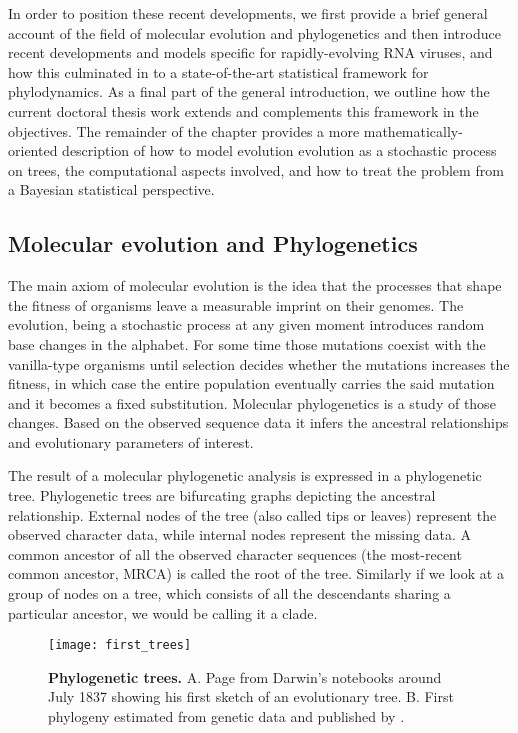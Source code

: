 In order to position these recent developments, we first provide a brief general account of the field of molecular evolution and phylogenetics and then introduce recent developments and models specific for rapidly-evolving RNA viruses, and how this culminated in to a state-of-the-art statistical framework for phylodynamics. As a final part of the general introduction, we outline how the current doctoral thesis work extends and complements this framework in the objectives.
The remainder of the chapter provides a more mathematically-oriented description of how to model evolution evolution as a stochastic process on trees, the computational aspects involved, and how to treat the problem from a Bayesian statistical perspective.

\subsection{Molecular evolution and Phylogenetics\label{sub:molevol}}

The main axiom of molecular evolution is the idea that the processes that shape the fitness of organisms leave a measurable imprint on their genomes.
The evolution, being a stochastic process at any given moment introduces random base changes in the alphabet.
For some time those mutations coexist with the vanilla-type organisms until selection decides whether the mutations increases the fitness, in which case the entire population eventually carries the said mutation and it becomes a fixed substitution.  
Molecular phylogenetics is a study of those changes.
Based on the observed sequence data it infers the ancestral relationships and evolutionary parameters of interest.

The result of a molecular phylogenetic analysis is expressed in a phylogenetic tree. 
Phylogenetic trees are bifurcating graphs depicting the ancestral relationship.
External nodes of the tree (also called tips or leaves) represent the observed character data, while internal nodes represent the missing data.  
A common ancestor of all the observed character sequences (the most-recent common ancestor, MRCA) is called the root of the tree.
Similarly if we look at a group of nodes on a tree, which consists of all the descendants sharing a particular ancestor, we would be calling it a clade.

\begin{figure}[H]
\centering
\texttt{[image: first\_trees]} 
\caption{
{ \footnotesize 
{\bf Phylogenetic trees.} A. Page from Darwin's notebooks around July 1837 showing his first sketch of an evolutionary tree.
B. First phylogeny estimated from genetic data and published by \cite{Fitch1967}.
}%
}
\label{fig:first_trees}
\end{figure}

